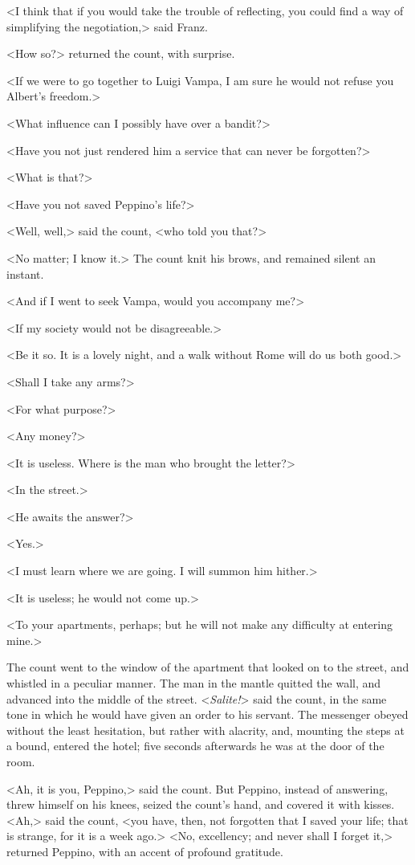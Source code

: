  <I think that if you would take the trouble of reflecting, you could find a way of simplifying the negotiation,> said Franz. 

 <How so?> returned the count, with surprise. 

 <If we were to go together to Luigi Vampa, I am sure he would not refuse you Albert's freedom.> 

 <What influence can I possibly have over a bandit?> 

 <Have you not just rendered him a service that can never be forgotten?> 

 <What is that?> 

 <Have you not saved Peppino's life?> 

 <Well, well,> said the count, <who told you that?> 

 <No matter; I know it.> The count knit his brows, and remained silent an instant. 

 <And if I went to seek Vampa, would you accompany me?> 

 <If my society would not be disagreeable.> 

 <Be it so. It is a lovely night, and a walk without Rome will do us both good.> 

 <Shall I take any arms?> 

 <For what purpose?> 

 <Any money?> 

 <It is useless. Where is the man who brought the letter?> 

 <In the street.> 

 <He awaits the answer?> 

 <Yes.> 

 <I must learn where we are going. I will summon him hither.> 

 <It is useless; he would not come up.> 

 <To your apartments, perhaps; but he will not make any difficulty at entering mine.> 

 The count went to the window of the apartment that looked on to the street, and whistled in a peculiar manner. The man in the mantle quitted the wall, and advanced into the middle of the street. <\textit{Salite!}> said the count, in the same tone in which he would have given an order to his servant. The messenger obeyed without the least hesitation, but rather with alacrity, and, mounting the steps at a bound, entered the hotel; five seconds afterwards he was at the door of the room. 

 <Ah, it is you, Peppino,> said the count. But Peppino, instead of answering, threw himself on his knees, seized the count's hand, and covered it with kisses. <Ah,> said the count, <you have, then, not forgotten that I saved your life; that is strange, for it is a week ago.>  <No, excellency; and never shall I forget it,> returned Peppino, with an accent of profound gratitude. 

